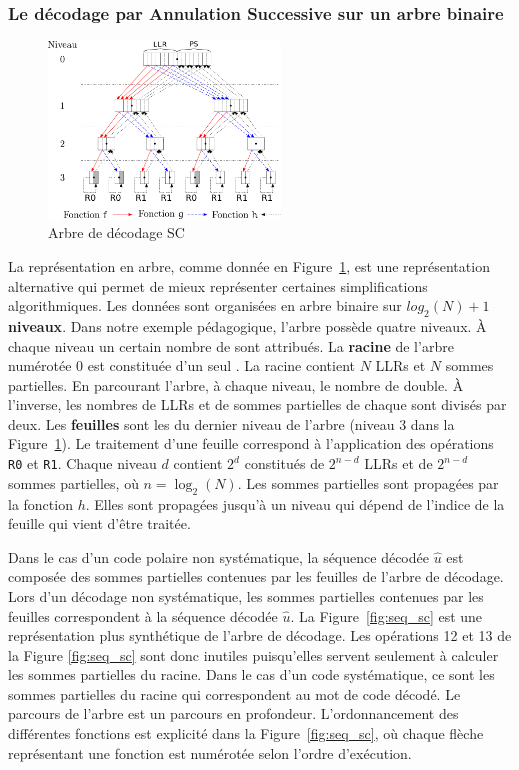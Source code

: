 \subsubsection{Le décodage par Annulation Successive sur un arbre binaire}
\begin{figure}[t]
\centering
\includegraphics[width=0.55\textwidth]{main/ch1_fig/sc}
\caption{Arbre de décodage SC}
\label{fig:sc}
\end{figure}
La représentation en arbre, comme donnée en Figure~\ref{fig:sc}, est une représentation alternative qui permet de mieux représenter certaines simplifications algorithmiques.
Les données sont organisées en arbre binaire sur $log_2(N) + 1$ \textbf{niveaux}. Dans notre exemple pédagogique, l'arbre possède quatre niveaux.
\`A chaque niveau un certain nombre de \textbf{\noeuds} sont attribués.
La \textbf{racine} de l'arbre numérotée $0$ est constituée d'un seul \noeud.
La racine contient $N$ LLRs et $N$ sommes partielles.
En parcourant l'arbre, à chaque niveau, le nombre de \noeuds double.
\`A l'inverse, les nombres de LLRs et de sommes partielles de chaque \noeud sont divisés par deux.
Les \textbf{feuilles} sont les \noeuds du dernier niveau de l'arbre (niveau 3 dans la Figure~\ref{fig:sc}).
Le traitement d'une feuille correspond à l'application des opérations \texttt{R0} et \texttt{R1}.
Chaque niveau $d$ contient $2^d$ \noeuds constitués de $2^{n-d}$ LLRs et de $2^{n-d}$ sommes partielles, où $n=\log_2(N)$. 
Les sommes partielles sont propagées par la fonction $h$. Elles sont propagées jusqu'à un niveau qui dépend de l'indice de la feuille qui vient d'être traitée.

Dans le cas d'un code polaire non systématique, la séquence décodée $\hat{u}$ est composée des sommes partielles contenues par les feuilles de l'arbre de décodage.
Lors d'un décodage non systématique, les sommes partielles contenues par les feuilles correspondent à la séquence décodée $\hat{u}$.
La Figure~\ref{fig:seq_sc} est une représentation plus synthétique de l'arbre de décodage.
Les opérations 12 et 13 de la Figure \ref{fig:seq_sc} sont donc inutiles puisqu'elles servent seulement à calculer les sommes partielles du \noeud racine.
Dans le cas d'un code systématique, ce sont les sommes partielles du \noeud racine qui correspondent au mot de code décodé.
Le parcours de l'arbre est un parcours en profondeur.
L'ordonnancement des différentes fonctions est explicité dans la Figure~\ref{fig:seq_sc}, où chaque flèche représentant une fonction est numérotée selon l'ordre d'exécution.


